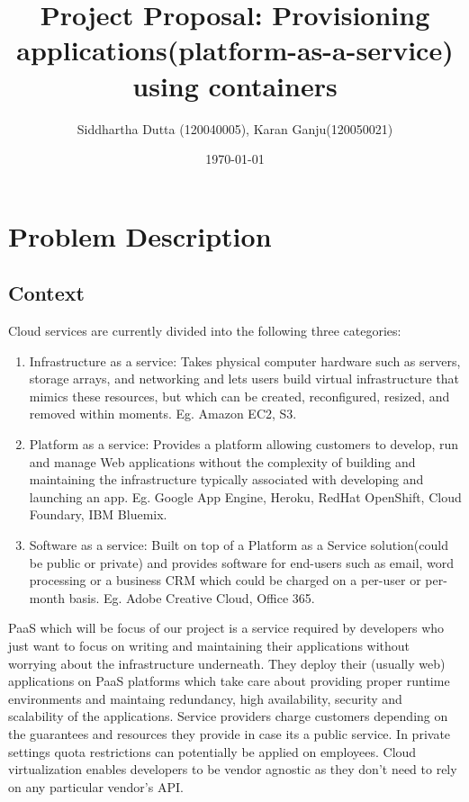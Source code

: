 \documentclass[a4paper]{article}
\title{Project Proposal: Provisioning applications(platform-as-a-service) using containers}
\author{Siddhartha Dutta (120040005), Karan Ganju(120050021)}
\date{\today}
\begin{document}
  \maketitle

  \section{Problem Description}

  \subsection{Context}
  
  Cloud services are currently divided into the following three categories:
  \begin{enumerate}
	  \item Infrastructure as a service: Takes physical computer hardware such as servers, storage arrays, and networking and lets users build virtual infrastructure that mimics these resources, but which can be created, reconfigured, resized, and removed within moments. Eg. Amazon EC2, S3.
	  \item Platform as a service: Provides a platform allowing customers to develop, run and manage Web applications without the complexity of building and maintaining the infrastructure typically associated with developing and launching an app. Eg. Google App Engine, Heroku, RedHat OpenShift, Cloud Foundary, IBM Bluemix.
	  \item Software as a service: Built on top of a Platform as a Service solution(could be public or private) and provides software for end-users such as email, word processing or a business CRM which could be charged on a per-user or per-month basis. Eg. Adobe Creative Cloud, Office 365.
  \end{enumerate}
  
  PaaS which will be focus of our project is a service required by developers who just want to focus on writing and maintaining their applications without worrying about the infrastructure underneath. They deploy their (usually web) applications on PaaS platforms which take care about providing proper runtime environments and maintaing redundancy, high availability, security and scalability of the applications. Service providers charge customers depending on the guarantees and resources they provide in case its a public service. In private settings quota restrictions can potentially be applied on employees. Cloud virtualization enables developers to be vendor agnostic as they don't need to rely on any particular vendor's API.
  
\end{document}
